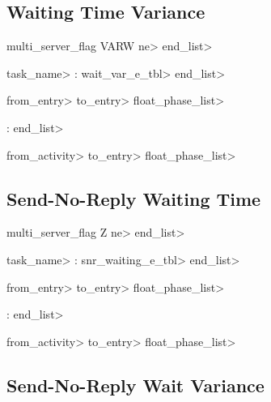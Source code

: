 \subsection{Waiting Time Variance}
\label{sec:rendezvous-variance-p}

\begin{bnf}{multi\_server\_flag}
   VARW \<ne>  \<end\_list>

   \<task\_name> : \<wait\_var\_e\_tbl> \<end\_list> 

   

   \<from\_entry> \<to\_entry> \<float\_phase\_list>

   :  \<end\_list>

   \<from\_activity> \<to\_entry> \<float\_phase\_list>
\end{bnf}

\subsection{Send-No-Reply Waiting Time}
\label{sec:send-no-reply-wait-p}

\begin{bnf}{multi\_server\_flag}
   Z \<ne>  \<end\_list>

   \<task\_name> : \<snr\_waiting\_e\_tbl> \<end\_list> 

   

   \<from\_entry> \<to\_entry> \<float\_phase\_list>

   :  \<end\_list>

   \<from\_activity> \<to\_entry> \<float\_phase\_list>

\end{bnf}

\subsection{Send-No-Reply Wait Variance}
\label{sec:send-no-reply-variance-p}


